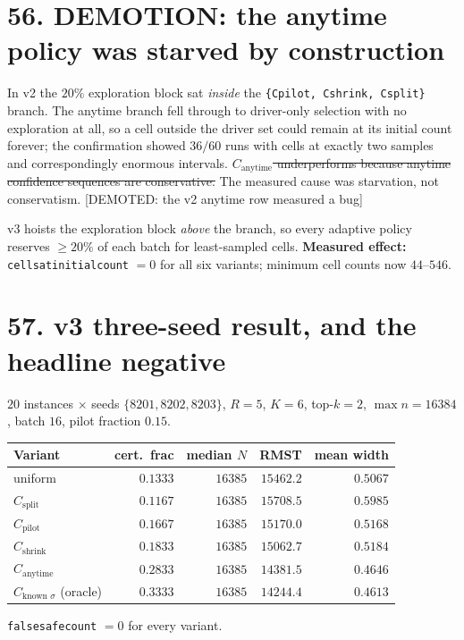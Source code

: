 \documentclass[9pt,twocolumn]{article}
\newcommand{\oldclaim}[1]{\sout{#1}}
\newcommand{\eclass}[1]{\textsf{[#1]}}
\renewcommand{\_}{\CIGunderscore\allowbreak}
\begin{document}
\section*{56. DEMOTION: the anytime policy was starved by construction}
In v2 the $20\%$ exploration block sat \emph{inside} the \texttt{\{C\_pilot, C\_shrink, C\_split\}} branch. The anytime branch fell through to driver-only selection with no exploration at all, so a cell outside the driver set could remain at its initial count forever; the confirmation showed $36/60$ runs with cells at exactly two samples and correspondingly enormous intervals. \oldclaim{$C_{\text{anytime}}$ underperforms because anytime confidence sequences are conservative.} The measured cause was starvation, not conservatism. \eclass{DEMOTED: the v2 anytime row measured a bug}

v3 hoists the exploration block \emph{above} the branch, so every adaptive policy reserves $\ge20\%$ of each batch for least-sampled cells. \textbf{Measured effect:} \texttt{cells\_at\_initial\_count} $=0$ for all six variants; minimum cell counts now $44$--$546$.

\section*{57. v3 three-seed result, and the headline negative}
$20$ instances $\times$ seeds $\{8201,8202,8203\}$, $R=5$, $K=6$, top-$k=2$, $\max n=16384$, batch $16$, pilot fraction $0.15$.
\begin{center}\scriptsize
\begin{tabularx}{0.98\columnwidth}{l r r r r}
\toprule
Variant & cert.\ frac & median $N$ & RMST & mean width\\
\midrule
uniform & $0.1333$ & $16385$ & $15462.2$ & $0.5067$\\
$C_{\text{split}}$ & $0.1167$ & $16385$ & $15708.5$ & $0.5985$\\
$C_{\text{pilot}}$ & $0.1667$ & $16385$ & $15170.0$ & $0.5168$\\
$C_{\text{shrink}}$ & $0.1833$ & $16385$ & $15062.7$ & $0.5184$\\
$C_{\text{anytime}}$ & $\mathbf{0.2833}$ & $16385$ & $14381.5$ & $0.4646$\\
$C_{\text{known }\sigma}$ (oracle) & $0.3333$ & $16385$ & $14244.4$ & $0.4613$\\
\bottomrule
\end{tabularx}
\end{center}
\texttt{false\_safe\_count} $=0$ for every variant.
\end{document}
